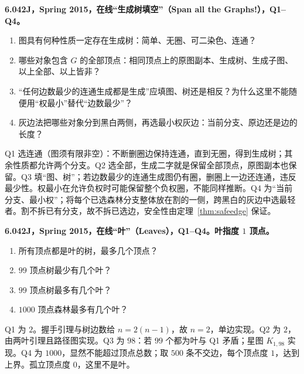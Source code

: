 \begin{exercise}
\textbf{6.042J，Spring 2015，在线“生成树填空”（Span all the Graphs!），Q1--Q4。}
\begin{enumerate}[label=Q\arabic*.]
\item\label{mit:6042-online-span-all-the-graphs-q1} 图具有何种性质一定存在生成树：简单、无圈、可二染色、连通？
\item\label{mit:6042-online-span-all-the-graphs-q2} 哪些对象包含 $G$ 的全部顶点：相同顶点上的原图副本、生成树、生成子图、以上全部、以上皆非？
\item\label{mit:6042-online-span-all-the-graphs-q3} “任何边数最少的连通生成\underline{\hspace{1em}}都是生成\underline{\hspace{1em}}”应填图、树还是相反？为什么这里不能随便用“权最小”替代“边数最少”？
\item\label{mit:6042-online-span-all-the-graphs-q4} 灰边法把哪些对象分到黑白两侧，再选最小权灰边：当前分支、原边还是边的长度？
\end{enumerate}
\end{exercise}
\begin{solution}
Q1 选连通（图须有限非空）：不断删圈边保持连通，直到无圈，得到生成树；其余性质都允许两个分支。Q2 选全部，生成二字就是保留全部顶点，原图副本也保留。Q3 填“图、树”；若边数最少的连通生成图仍有圈，删圈上一边还连通，违反最少性。权最小在允许负权时可能保留整个负权圈，不能同样推断。Q4 为“当前分支、最小权”；将每个已选森林分支整体放在割的一侧，跨黑白的灰边中选最轻者。割不拆已有分支，故不拆已选边，安全性由定理~\ref{thm:safeedge} 保证。
\end{solution}

\begin{exercise}
\textbf{6.042J，Spring 2015，在线“叶”（Leaves），Q1--Q4。叶指度 $1$ 顶点。}
\begin{enumerate}[label=Q\arabic*.]
\item\label{mit:6042-online-leaves-q1} 所有顶点都是叶的树，最多几个顶点？
\item\label{mit:6042-online-leaves-q2} $99$ 顶点树最少有几个叶？
\item\label{mit:6042-online-leaves-q3} $99$ 顶点树最多有几个叶？
\item\label{mit:6042-online-leaves-q4} $1000$ 顶点森林最多有几个叶？
\end{enumerate}
\end{exercise}
\begin{solution}
Q1 为 $2$。握手引理与树边数给 $n=2(n-1)$，故 $n=2$，单边实现。Q2 为 $2$，由两叶引理且路径图实现。Q3 为 $98$：若 $99$ 个都为叶与 Q1 矛盾；星图 $K_{1,98}$ 实现。Q4 为 $1000$，显然不能超过顶点总数；取 $500$ 条不交边，每个顶点度 $1$，达到上界。孤立顶点度 $0$，这里不是叶。
\end{solution}

